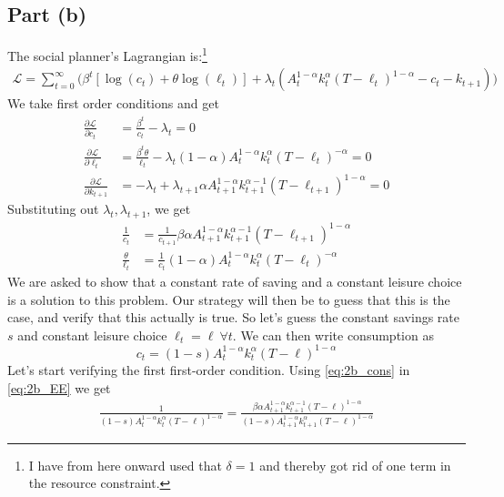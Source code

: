 \documentclass{scrartcl}
\newcommand{\lep}{\left(}
\newcommand{\rip}{\right)}
\newcommand{\leh}{\left[}
\newcommand{\rih}{\right]}
\begin{document}
\subsection*{Part (b)}
The social planner's Lagrangian is:\footnote{I have from here onward used that $\delta=1$ and thereby got rid of one term in the resource constraint. }  
\begin{align*}
	\mathcal{L} = \sum_{t=0}^{\infty} \Big( \beta^t \leh \log (c_t) + \theta \log (\ell_t) \rih + \lambda_t \lep A_t^{1-\alpha} k_t^\alpha (T-\ell_t)^{1-\alpha} - c_t - k_{t+1}\rip \Big)
\end{align*}
We take first order conditions and get
\begin{align*}
	\frac{\partial \mathcal{L}}{\partial c_t} &= 
	\frac{\beta^t}{c_t} - \lambda_t = 0 \\
	\frac{\partial \mathcal{L}}{\partial \ell_t} &= 
	\frac{\beta^t \theta}{\ell_t} - \lambda_t (1-\alpha) A_t^{1-\alpha} k_t^\alpha (T-\ell_t)^{-\alpha} = 0 \\
	\frac{\partial \mathcal{L}}{\partial k_{t+1}} &= 
	-\lambda_t + \lambda_{t+1} \alpha A_{t+1}^{1-\alpha} k_{t+1}^{\alpha-1} (T-\ell_{t+1})^{1-\alpha} = 0 
\end{align*}
Substituting out $\lambda_t, \lambda_{t+1}$, we get
\begin{align}
	\frac{1}{c_t} &= \frac{1}{c_{t+1}}\beta 
	\alpha A_{t+1}^{1-\alpha} k_{t+1}^{\alpha-1} (T-\ell_{t+1})^{1-\alpha} \label{eq:2b_EE}\\
	\frac{\theta}{\ell_t} &= \frac{1}{c_{t}} 
	(1-\alpha) A_t^{1-\alpha} k_t^{\alpha} (T-\ell_t)^{-\alpha} \label{eq:2b_intra}
\end{align}
We are asked to show that a constant rate of saving and a constant leisure choice is a solution to this problem. Our strategy will then be to guess that this is the case, and verify that this actually is true. So let's guess the constant savings rate $s$ and constant leisure choice $\ell_t = \ell ~\forall t$. We can then write consumption as
\begin{equation} \label{eq:2b_cons}
	c_t = (1-s)A_t^{1-\alpha} k_t^{\alpha} (T-\ell)^{1-\alpha}
\end{equation}
Let's start verifying the first first-order condition. Using \eqref{eq:2b_cons} in \eqref{eq:2b_EE} we get 
\begin{align*}
	\frac{1}{(1-s)A_t^{1-\alpha} k_t^{\alpha} (T-\ell)^{1-\alpha}} =
	\frac{\beta \alpha A_{t+1}^{1-\alpha} k_{t+1}^{\alpha-1} (T-\ell)^{1-\alpha}}
	{(1-s)A_{t+1}^{1-\alpha} k_{t+1}^{\alpha} (T-\ell)^{1-\alpha}}
\end{align*}
\end{document}
